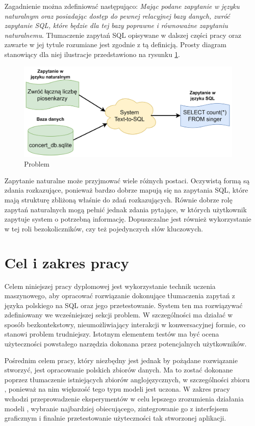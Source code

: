 Zagadnienie  można zdefiniować następująco: \textit{Mając podane zapytanie w języku naturalnym oraz posiadając dostęp do pewnej relacyjnej bazy danych, zwróć zapytanie SQL, które będzie dla tej bazy poprawne i równoważne zapytaniu naturalnemu}. Tłumaczenie zapytań SQL opisywane w dalszej części pracy oraz zawarte w jej tytule rozumiane jest zgodnie z tą definicją. Prosty diagram stanowiący dla niej ilustracje przedstawiono na rysunku \ref{fig:text-to-sql}.

\begin{figure}[ht!]
  \centering
  \includegraphics[width=0.8\linewidth]{images/text_to_sql.png}
  \caption{Problem }
  \label{fig:text-to-sql}
\end{figure}

Zapytanie naturalne może przyjmować wiele różnych postaci. Oczywistą formą są zdania rozkazujące, ponieważ bardzo dobrze mapują się na zapytania SQL, które mają strukturę zbliżoną właśnie do zdań rozkazujących. Równie dobrze rolę zapytań naturalnych mogą pełnić jednak zdania pytające, w których użytkownik zapytuje system o potrzebną informację. Dopuszczalne jest również wykorzystanie w tej roli bezokoliczników, czy też pojedynczych słów kluczowych.

\section{Cel i zakres pracy}
Celem niniejszej pracy dyplomowej jest wykorzystanie technik uczenia maszynowego, aby opracować rozwiązanie dokonujące tłumaczenia zapytań z języka polskiego na SQL oraz jego przetestowanie. System ten ma rozwiązywać zdefiniowany we wcześniejszej sekcji problem. W szczególności ma działać w sposób bezkontekstowy, nieumożliwiający interakcji w konwersacyjnej formie, co stanowi problem trudniejszy. Istotnym elementem testów ma być ocena użyteczności powstałego narzędzia dokonana przez potencjalnych użytkowników.

Pośrednim celem pracy, który niezbędny jest jednak by pożądane rozwiązanie stworzyć, jest opracowanie polskich zbiorów danych. Ma to zostać dokonane poprzez tłumaczenie istniejących zbiorów anglojęzycznych, w szczególności zbioru , ponieważ na nim większość tego typu modeli jest uczona. W zakres pracy wchodzi przeprowadzenie eksperymentów w celu lepszego zrozumienia działania modeli , wybranie najbardziej obiecującego, zintegrowanie go z interfejsem graficznym i finalnie przetestowanie użyteczności tak stworzonej aplikacji.

